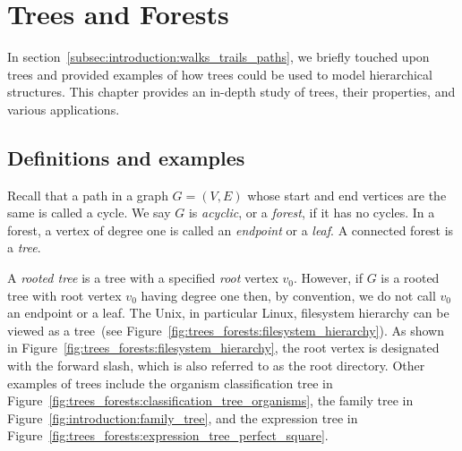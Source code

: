 
\chapter{Trees and Forests}
\label{chap:trees_forests}

In section~\ref{subsec:introduction:walks_trails_paths}, we briefly
touched upon trees and provided examples of how trees could be used to
model hierarchical structures. This chapter provides an in-depth study
of trees, their properties, and various applications.

{
}



\section{Definitions and examples}

Recall that a path in a graph $G = (V, E)$ whose start and end vertices
are the same is called a cycle. We say $G$ is
\emph{acyclic}, or a \emph{forest}, if it
has no cycles. In a forest, a vertex of degree one is called an
\emph{endpoint} or a \emph{leaf}. A
connected forest is a \emph{tree}.

A \emph{rooted tree} is a tree with a
specified \emph{root} vertex $v_0$. However, if $G$ is a
rooted tree with root vertex $v_0$ having degree one then, by
convention, we do not call $v_0$ an endpoint or a leaf. The
Unix, in particular Linux,
filesystem hierarchy can be viewed as a tree~(see
Figure~\ref{fig:trees_forests:filesystem_hierarchy}). As shown in
Figure~\ref{fig:trees_forests:filesystem_hierarchy}, the root
vertex is designated with the forward slash, which
is also referred to as the root
directory. Other examples of trees include the
organism classification tree in
Figure~\ref{fig:trees_forests:classification_tree_organisms}, the
family tree in
Figure~\ref{fig:introduction:family_tree}, and the
expression tree in
Figure~\ref{fig:trees_forests:expression_tree_perfect_square}.

